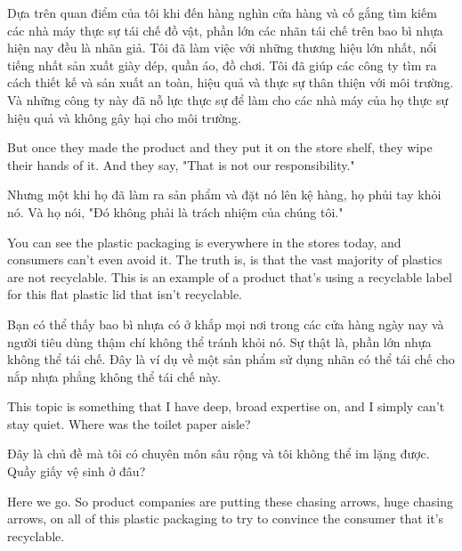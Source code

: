 \documentclass[a4paper]{article}
\begin{document}
	\begin{vietnamese-v2}
		Dựa trên quan điểm của tôi khi đến hàng nghìn cửa hàng và cố gắng tìm kiếm các nhà máy thực sự tái chế đồ vật, phần lớn các nhãn tái chế trên bao bì nhựa hiện nay đều là nhãn giả.
		Tôi đã làm việc với những thương hiệu lớn nhất, nổi tiếng nhất sản xuất giày dép, quần áo, đồ chơi.
		Tôi đã giúp các công ty tìm ra cách thiết kế và sản xuất an toàn, hiệu quả và thực sự thân thiện với môi trường.
		Và những công ty này đã nỗ lực thực sự để làm cho các nhà máy của họ thực sự hiệu quả và không gây hại cho môi trường.
	\end{vietnamese-v2}
	
	But once they made the product and they put it on the store shelf, they wipe their hands of it.
	And they say, "That is not our responsibility."
	
	\begin{vietnamese-v2}
		Nhưng một khi họ đã làm ra sản phẩm và đặt nó lên kệ hàng, họ phủi tay khỏi nó.
		Và họ nói, "Đó không phải là trách nhiệm của chúng tôi."
	\end{vietnamese-v2}
	
	You can see the plastic packaging is everywhere in the stores today, and consumers can't even avoid it.
	The truth is, is that the vast majority of plastics are not recyclable.
	This is an example of a product that's using a recyclable label for this flat plastic lid that isn't recyclable.
	
	\begin{vietnamese-v2}
		Bạn có thể thấy bao bì nhựa có ở khắp mọi nơi trong các cửa hàng ngày nay và người tiêu dùng thậm chí không thể tránh khỏi nó.
		Sự thật là, phần lớn nhựa không thể tái chế.
		Đây là ví dụ về một sản phẩm sử dụng nhãn có thể tái chế cho nắp nhựa phẳng không thể tái chế này.
	\end{vietnamese-v2}

	This topic is something that I have deep, broad expertise on, and I simply can't stay quiet.
	Where was the toilet paper aisle?
	
	\begin{vietnamese-v2}
		Đây là chủ đề mà tôi có chuyên môn sâu rộng và tôi không thể im lặng được.
		Quầy giấy vệ sinh ở đâu?
	\end{vietnamese-v2}
	
	Here we go.
	So product companies are putting these chasing arrows, huge chasing arrows, on all of this plastic packaging to try to convince the consumer that it's recyclable.
	
\end{document}
